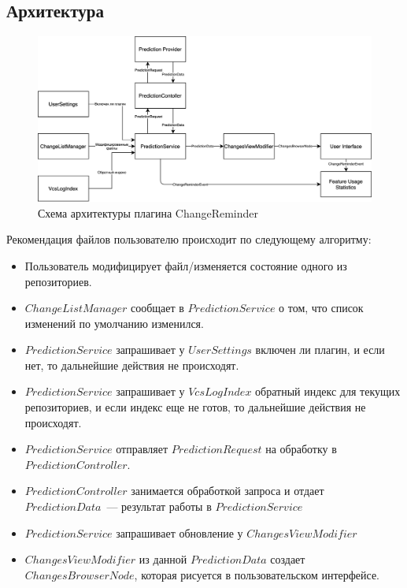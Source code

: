 \subsection{Архитектура}
\begin{figure}[!h]
\caption{Схема архитектуры плагина ChangeReminder}\label{ChangeReminder-arch}
\centering
\includegraphics[scale=0.14]{images/ChangeReminderArch.png}
\end{figure}
Рекомендация файлов пользователю происходит по следующему алгоритму:
    \begin{itemize}
        \item Пользователь модифицирует файл/изменяется состояние одного из репозиториев.
        \item $ChangeListManager$ сообщает в $PredictionService$ о том, что список изменений по умолчанию изменился.
        \item $PredictionService$ запрашивает у $UserSettings$ включен ли плагин, и если нет, то дальнейшие действия не происходят.
        \item $PredictionService$ запрашивает у $VcsLogIndex$ обратный индекс для текущих репозиториев, и если индекс еще не готов, то дальнейшие действия не происходят.
        \item $PredictionService$ отправляет $PredictionRequest$ на обработку в $PredictionController$.
        \item $PredictionController$ занимается обработкой запроса и отдает $PredictionData$~--- результат работы в $PredictionService$
        \item $PredictionService$ запрашивает обновление у $ChangesViewModifier$
        \item $ChangesViewModifier$ из данной $PredictionData$ создает $ChangesBrowserNode$, которая рисуется в пользовательском интерфейсе.
    \end{itemize}
    
